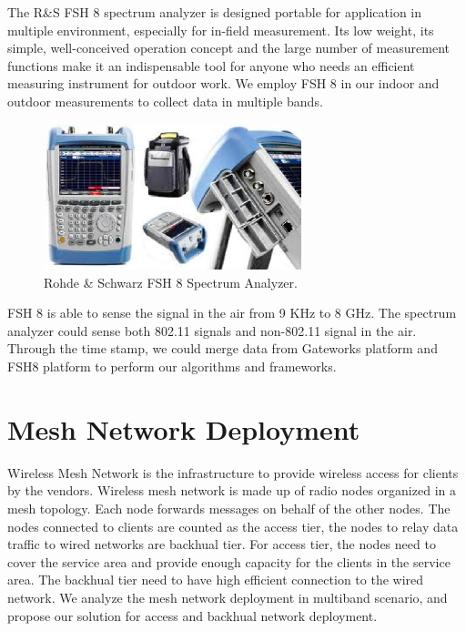 The R\&S FSH 8 spectrum analyzer is designed portable for application 
in multiple environment, especially for in-field measurement. Its low 
weight, its simple, well-conceived operation concept and the large number 
of measurement functions make it an indispensable tool for anyone who 
needs an efficient measuring instrument for outdoor work. We employ 
FSH 8 in our indoor and outdoor measurements to collect data in multiple
bands.

\begin{figure} 
\centering
\includegraphics[width=75mm]{figures/fsh8}
\vspace{-0.1in}
\caption{Rohde \& Schwarz FSH 8 Spectrum Analyzer.}
\label{fig:fsh8}
\vspace{0.1in}
\end{figure}

FSH 8 is able to sense the signal in the air from 9 KHz to 
8 GHz. The spectrum analyzer could sense both 802.11 signals 
and non-802.11 signal in the air. Through the time stamp, 
we could merge data from Gateworks platform and FSH8 platform 
to perform our algorithms and frameworks.

\section{Mesh Network Deployment}

Wireless Mesh Network is the infrastructure to provide 
wireless access for clients by the vendors. Wireless 
mesh network is made up of radio nodes organized in a mesh 
topology. Each node forwards messages on behalf of the 
other nodes. The nodes connected to clients are counted 
as the access tier, the nodes to relay data traffic to 
wired networks are backhual tier. For access tier, the 
nodes need to cover the service area and provide enough 
capacity for the clients in the service area. The backhual 
tier need to have high efficient connection to the wired 
network. We analyze the mesh network deployment in multiband 
scenario, and propose our solution for access and backhual 
network deployment.

